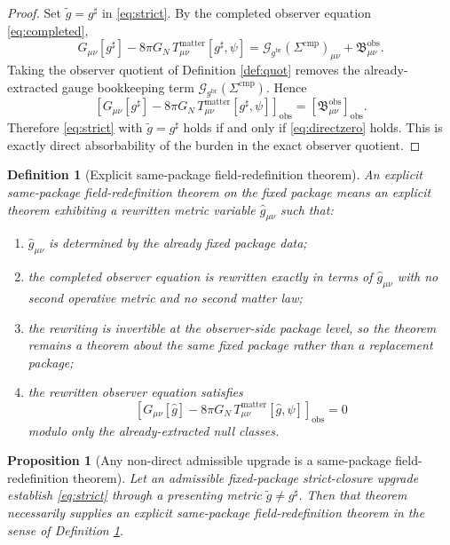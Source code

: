 \documentclass[11pt]{article}
\newcommand{\ObserverMetric}{g^{\mathrm{br}}}
\newcommand{\CompletedMetric}{g^{\sharp}}
\newcommand{\PresentedMetric}{\widetilde g}
\newcommand{\RedefMetric}{\widehat g}
\newcommand{\CompShift}{\Sigma^{\mathrm{cmp}}}
\newcommand{\GaugeBook}{\mathcal G_{\ObserverMetric}}
\newcommand{\ObsBurden}{\mathfrak B_{\mu\nu}^{\mathrm{obs}}}
\newcommand{\ObserverClass}[1]{\left[#1\right]_{\mathrm{obs}}}
\newtheorem{definition}{Definition}
\newtheorem{proposition}{Proposition}
\begin{document}
\begin{proof}
Set \(\PresentedMetric=\CompletedMetric\) in \eqref{eq:strict}. By the completed observer equation \eqref{eq:completed},
\[
G_{\mu\nu}[\CompletedMetric]-8\pi G_N\,T_{\mu\nu}^{\mathrm{matter}}[\CompletedMetric,\psi]
=
\GaugeBook(\CompShift)_{\mu\nu}
+\ObsBurden.
\]
Taking the observer quotient of Definition \ref{def:quot} removes the already-extracted gauge bookkeeping term \(\GaugeBook(\CompShift)\). Hence
\[
\ObserverClass{G_{\mu\nu}[\CompletedMetric]-8\pi G_N\,T_{\mu\nu}^{\mathrm{matter}}[\CompletedMetric,\psi]}
=
\ObserverClass{\ObsBurden}.
\]
Therefore \eqref{eq:strict} with \(\PresentedMetric=\CompletedMetric\) holds if and only if \eqref{eq:directzero} holds. This is exactly direct absorbability of the burden in the exact observer quotient.
\end{proof}

\begin{definition}[Explicit same-package field-redefinition theorem]
\label{def:redef}
An \emph{explicit same-package field-redefinition theorem} on the fixed package means an explicit theorem exhibiting a rewritten metric variable \(\RedefMetric_{\mu\nu}\) such that:
\begin{enumerate}
    \item \(\RedefMetric_{\mu\nu}\) is determined by the already fixed package data;
    \item the completed observer equation is rewritten exactly in terms of \(\RedefMetric_{\mu\nu}\) with no second operative metric and no second matter law;
    \item the rewriting is invertible at the observer-side package level, so the theorem remains a theorem about the same fixed package rather than a replacement package;
    \item the rewritten observer equation satisfies
    \[
    \ObserverClass{G_{\mu\nu}[\RedefMetric]-8\pi G_N\,T_{\mu\nu}^{\mathrm{matter}}[\RedefMetric,\psi]}=0
    \]
    modulo only the already-extracted null classes.
\end{enumerate}
\end{definition}

\begin{proposition}[Any non-direct admissible upgrade is a same-package field-redefinition theorem]
\label{prop:redef}
Let an admissible fixed-package strict-closure upgrade establish \eqref{eq:strict} through a presenting metric \(\PresentedMetric\neq\CompletedMetric\). Then that theorem necessarily supplies an explicit same-package field-redefinition theorem in the sense of Definition \ref{def:redef}.
\end{proposition}
\end{document}
